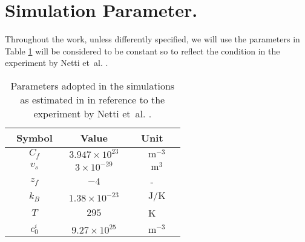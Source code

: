 \section{Simulation Parameter.}
\label{para}
Throughout the work, unless differently specified, we will use the parameters in Table \ref{Tab1} will be considered to be constant so to reflect the condition in the experiment by Netti et~al. \cite{Netti,ecm2}.
\begin{table}[h!]
	\vspace{4mm}
	\centering
	\begin{tabular}{||c c c||}
		\hline\addlinespace[2pt]
		Symbol  & Value& Unit\\
		\hline\addlinespace[5pt]
		$\qquad C_f\qquad$  & $3.947\times 10^{23}$& $\qquad\text{m}^{-3}\quad$\\
		$\qquad v_s\qquad$  & $3\times 10^{-29}$& $\qquad\text{m}^3\quad$ \\
		$\qquad z_f\qquad$ & $-4$& -\\
		$\qquad k_B\qquad$ & $1.38 \times 10^{-23}$& $\qquad\text{J}/\text{K}\quad$\\
		$\qquad T\qquad$ &$295$ &K\\
		$\qquad c^i_0\qquad$ & $9.27\times 10^{25}$& $\qquad\text{m}^{-3}\quad$\\
		\hline
	\end{tabular}
	\vspace{2mm}
	\caption{Parameters adopted in the simulations as estimated in \cite{ecm2} in reference to the experiment by Netti et~al. \cite{Netti}.}
	\label{Tab1}
\end{table}

